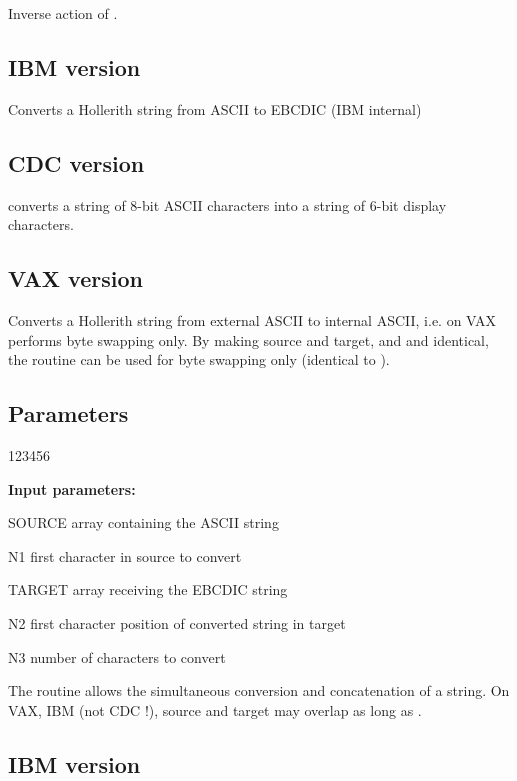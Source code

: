 Inverse action of .


\subsection*{IBM version}
 
Converts a Hollerith string from ASCII to EBCDIC (IBM internal)
 
\subsection*{CDC version}
 
 converts a string of 8-bit ASCII characters
into a string of 6-bit display characters.
 
\subsection*{VAX version}
 
Converts a Hollerith string from external ASCII to
internal ASCII, i.e. on VAX performs byte swapping only.
By making source and target, and  and  identical, the routine
can be used for byte swapping only (identical to ).
 
\subsection*{Parameters}

\begin{DLtt}{123456}
\item[{\rm\bf Input parameters:}]
\item[SOURCE] array containing the ASCII string
\item[N1]     first character in source to convert
\item[TARGET] array receiving the EBCDIC string
\item[N2]     first character position of converted string in target
\item[N3]     number of characters to convert
\end{DLtt}
 
The routine allows the simultaneous conversion and
concatenation of a string. 
On VAX, IBM (not CDC !), source and
target may overlap as long as .


\subsection*{IBM version}
 
